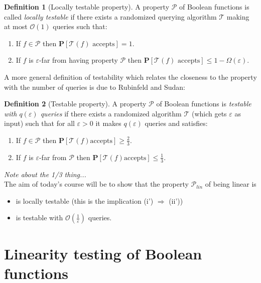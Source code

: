 \documentclass[a4paper]{article}
\newcommand{\prob}{\mathbf{P}}
\newcommand{\prty}{\mathcal{P}}
\newcommand{\eps}{\varepsilon}
\theoremstyle{plain}
\theoremstyle{definition}
\newtheorem{definition}{Definition}
\theoremstyle{remark}
\begin{document}
\begin{definition}[Locally testable property]
  A property \(\prty\) of Boolean functions is called \emph{locally
    testable} if there exists a randomized querying algorithm
  \(\mathcal{T}\) making at most \(\mathcal{O}(1)\) queries such that: 
  \begin{enumerate}[label=(\roman*)]
  \item If \(f \in \prty\) then \(\prob[\mathcal{T}(f) \text{ accepts}] = 1\).
  \item If \(f\) is \(\eps\)-far from having property \(\prty\) then
    \(\prob[\mathcal{T}(f) \text{ accepts}] \leq 1 - \Omega(\eps)\).
  \end{enumerate}
\end{definition}

\noindent A more general definition of testability which relates the
closeness to the property with the number of queries is due to
Rubinfeld and Sudan: 

\begin{definition}[Testable property]
  A property \(\prty\) of Boolean functions is \emph{testable with
    \(q(\eps)\) queries} if there exists a randomized algorithm
  \(\mathcal{T}\) (which gets \(\eps\) as input) such that for all
  \(\eps > 0\) it makes \(q(\eps)\) queries and satisfies:
  \begin{enumerate}[label=(\roman*)]
  \item If \(f \in \prty\) then \(\prob[\mathcal{T}(f) \text{
      accepts}] \geq \frac{2}{3}\).
  \item If \(f\) is \(\eps\)-far from \(\prty\) then \(\prob[\mathcal{T}(f) \text{
      accepts}] \leq \frac{1}{3}\).
  \end{enumerate}
\end{definition}

\emph{Note about the 1/3 thing...}\\

\noindent The aim of today's course will be to show that the property
\(\prty_{lin}\) of being linear is 
\begin{itemize}
\item is locally testable (this is the implication (i') \(\Rightarrow\)
  (ii'))
\item is testable with \(\mathcal{O}\left(\frac{1}{\eps}\right)\)
  queries. 
\end{itemize}


\section{Linearity testing of Boolean functions}
\label{sec:line-test-bool}
\end{document}
